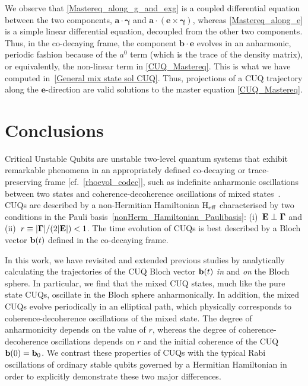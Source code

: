 \documentclass[12pt,a4paper]{article}
\begin{document}
We observe that \eqref{Mastereq_along_g_and_exg} is a coupled differential equation between the two components, $\mathbf{a}\cdot\boldsymbol{\gamma}$ and $\mathbf{a}\cdot(\mathbf{e}\times\boldsymbol{\gamma})$, whereas \eqref{Mastereq_along_e} is a simple linear differential equation, decoupled from the other two components. Thus, in the co-decaying frame, the component $\mathbf{b}\cdot\mathbf{e}$ evolves in an anharmonic, periodic fashion because of the $a^0$ term (which is the trace of the density matrix), or equivalently, the non-linear term in \eqref{CUQ_Mastereq}. This is what we have computed in~\eqref{General mix state sol CUQ}. Thus, projections of a CUQ trajectory along the $\mathbf{e}$-direction are valid solutions to the master equation \eqref{CUQ_Mastereq}.


\section{Conclusions}\label{sec:Concl}

Critical Unstable Qubits are unstable two-level quantum systems that exhibit remarkable phenomena in an appropriately defined co-decaying or trace-preserving frame [cf.~\eqref{rhoevol_codec}], such as indefinite anharmonic oscillations between two states and coherence-decoherence oscillations of mixed states~\cite{Karamitros:2022oew,Karamitros:2025azy}.
CUQs are described by a non-Hermitian Hamiltonian $\text{H}_{\rm eff}$ characterised by two conditions in the Pauli basis~\eqref{nonHerm_Hamiltonian_Paulibasis}: (i)~${\bf E}\perp {\bf \Gamma}$ and (ii)~$r\equiv |{\bf \Gamma}|/(2|{\bf E}|) < 1$. 
The time evolution of CUQs is best described by a Bloch vector ${\bf b}(t)$ defined in the co-decaying frame.

In this work, we have revisited and extended previous studies 
by analytically calculating the trajectories of the CUQ Bloch vector ${\bf b}(t)$ {\em in} and {\em on} the Bloch sphere. 
In particular, we find that the mixed CUQ states, much like the pure state CUQs, oscillate in the Bloch sphere an\-harmonically. In addition, the mixed CUQs evolve periodically in an elliptical path, which physically corresponds to coherence-decoherence oscillations of the mixed state. The degree of anharmonicity depends on the value of $r$, whereas the degree of coherence-decoherence oscillations depends on $r$ and the initial coherence of the CUQ ${\bf b}(0) = {\bf b}_0$. We contrast these properties of CUQs with the typical Rabi oscillations of ordinary stable qubits governed by a
Hermitian Hamiltonian in order to explicitly demonstrate these two major differences. 
\end{document}
